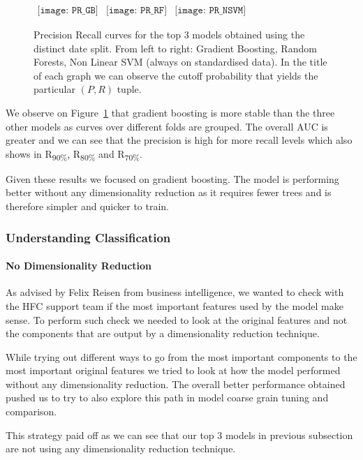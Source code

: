 \begin{figure}[h]
\begin{center}$
\begin{array}{ccc}
\texttt{[image: PR\_GB]} &
\texttt{[image: PR\_RF]} &
\texttt{[image: PR\_NSVM]}
\end{array}$
\end{center}
\caption{\label{PR_curves} Precision Recall curves for the top 3 models obtained using the distinct date split. From left to right: Gradient Boosting, Random Forests, Non Linear SVM (always on standardised data). In the title of each graph we can observe the cutoff probability that yields the particular $(P,R)$ tuple.}
\end{figure}

We observe on Figure~\ref{PR_curves} that gradient boosting is more stable than the three other models as curves over different folds are grouped. The overall AUC is greater and we can see that the precision is high for more recall levels which also shows in R\textsubscript{90\%}, R\textsubscript{80\%} and R\textsubscript{70\%}. 

Given these results we focused on gradient boosting. The model is performing better without any dimensionality reduction as it requires fewer trees and is therefore simpler and quicker to train. 


\subsubsection{Understanding Classification}
\paragraph{No Dimensionality Reduction}
As advised by Felix Reisen from business intelligence, we wanted to check with the HFC support team if the most important features used by the model make sense. To perform such check we needed to look at the original features and not the components that are output by a dimensionality reduction technique. 

While trying out different ways to go from the most important components to the most important original features we tried to look at how the model performed without any dimensionality reduction. The overall better performance obtained pushed us to try to also explore this path in model coarse grain tuning and comparison. 

This strategy paid off as we can see that our top 3 models in previous subsection are not using any dimensionality reduction technique. 

